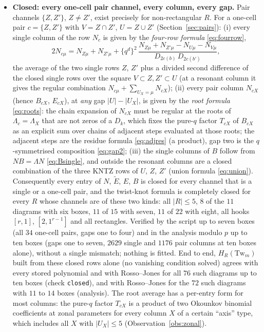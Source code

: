 \documentclass[11pt]{article}
\newcommand{\Tw}{\mathrm{Tw}}
\newcommand{\Lam}{\Lambda}
\newcommand{\Et}{\widetilde{E}}
\newcommand{\LMPH}[1]{\texttt{#1}}
\begin{document}
\begin{itemize}
\item \textbf{Closed: every one-cell pair channel, every column, every gap.}  Pair channels $\{Z,Z'\}$, $Z\ne Z'$,
exist precisely for non-rectangular $R$.  For a one-cell pair $c=\{Z,Z'\}$ with $V=Z\cap Z'$, $U=Z\cup Z'$
(Section~\ref{sec:pairs}): (i) every single column of the row $N_c$ is given by the \emph{four-row formula}
\eqref{eq:fourrow},
\[
2N_{c\mu}=N_{Z\mu}+N_{Z'\mu}+\{q^d\}^2\,\frac{N_{Z\mu}+N_{Z'\mu}-N_{U\mu}-N_{V\mu}}{D_{2c(b)}\,D_{2c(b')}},
\]
the average of the two single rows $Z$, $Z'$ plus a divided second difference of the closed single rows over the
square $V\subset Z,Z'\subset U$ (at a resonant column it gives the regular combination $N_{c\mu}+\sum_{U_X=\mu}N_{cX}$);
(ii) every pair column $N_{cX}$ (hence $B_{cX}$, $E_{cX}$), at \emph{any} gap $|U|-|U_X|$, is given by the
\emph{root formula} \eqref{eq:roots}: the chain expansion of $N_{cX}$ must be regular at the roots of
$\Lam_c=\Lam_X$ that are not zeros of a $D_k$, which fixes the pure-$q$ factor $T_{cX}$ of $B_{cX}$ as an explicit
sum over chains of adjacent steps evaluated at those roots; the adjacent steps are the residue formula
\eqref{eq:adjres} (a product), gap two is the $q$-symmetrised composition \eqref{eq:gap2}; (iii) the single columns of
$B$ follow from $NB=\Lam N$ \eqref{eq:Bsingle}, and outside the resonant columns are a closed combination of the three
KNTZ rows of $U$, $Z$, $Z'$ (union formula \eqref{eq:union}).  Consequently every entry of $N$, $\Et$, $E$, $B$ is
closed for every channel that is a single or a one-cell pair, and the twist-knot formula is completely closed for every
$R$ whose channels are of these two kinds: all $|R|\le5$, $8$ of the $11$ diagrams with six boxes, $11$ of $15$ with
seven, $11$ of $22$ with eight, all hooks $[r,1]$, $[2,1^{r-1}]$ and all rectangles.  Verified by the script up to
seven boxes (all $34$ one-cell pairs, gaps one to four) and in the analysis modulo $p$ up to ten boxes (gaps one to
seven, $2629$ single and $1176$ pair columns at ten boxes alone), without a single mismatch; nothing is fitted.  End to
end, $H_R(\Tw_m)$ built from these closed rows alone (no vanishing condition solved) agrees with every stored polynomial
and with Rosso--Jones for all $76$ such diagrams up to ten boxes (check \LMPH{closed}), and with Rosso--Jones for the $72$
such diagrams with $11$ to $14$ boxes (analysis).  The root average has a per-entry form for most columns: the pure-$q$
factor $T_{cX}$ is a product of two Okounkov binomial coefficients at zonal parameters for every column $X$ of a certain
``axis'' type, which includes all $X$ with $|U_X|\le5$ (Observation~\ref{obs:zonal}).


\end{itemize}
\end{document}
